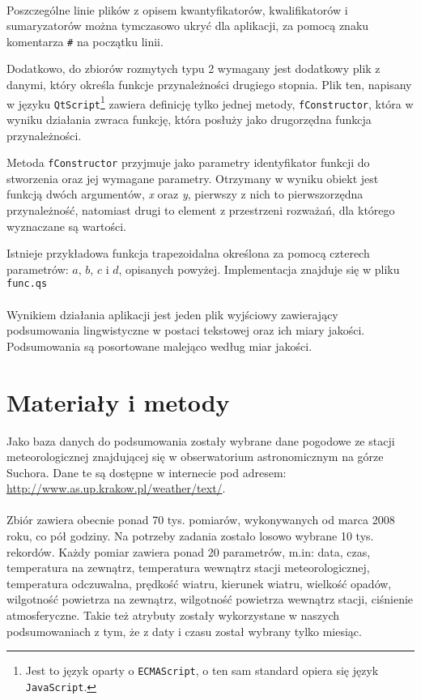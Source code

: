 \documentclass{classrep}
\begin{document}
\paragraph{}
Poszczególne linie plików z opisem kwantyfikatorów, kwalifikatorów i sumaryzatorów można tymczasowo ukryć dla aplikacji, za pomocą znaku komentarza \verb|#| na początku linii.

Dodatkowo, do zbiorów rozmytych typu 2 wymagany jest dodatkowy plik z danymi, który określa funkcje przynależności drugiego stopnia. Plik ten, napisany w języku \verb|QtScript|\footnote{Jest to język oparty o \texttt{ECMAScript}, o ten sam standard opiera się język \texttt{JavaScript}.} zawiera definicję tylko jednej metody, \verb|fConstructor|, która w wyniku działania zwraca funkcję, która posłuży jako drugorzędna funkcja przynależności.

Metoda \verb|fConstructor| przyjmuje jako parametry identyfikator funkcji do stworzenia oraz jej wymagane parametry. Otrzymany w wyniku obiekt jest funkcją dwóch argumentów, \textit{x} oraz \textit{y}, pierwszy z nich to pierwszorzędna przynależność, natomiast drugi to element z przestrzeni rozważań, dla którego wyznaczane są wartości.

Istnieje przykładowa funkcja trapezoidalna określona za pomocą czterech parametrów: $a$, $b$, $c$ i $d$, opisanych powyżej. Implementacja znajduje się w pliku \verb|func.qs|

\paragraph{}
Wynikiem działania aplikacji jest jeden plik wyjściowy zawierający podsumowania lingwistyczne w postaci tekstowej oraz ich miary jakości. Podsumowania są posortowane malejąco według miar jakości.

\section{Materiały i metody}
Jako baza danych do podsumowania zostały wybrane dane pogodowe ze stacji meteorologicznej znajdującej się w obserwatorium astronomicznym na górze Suchora. Dane te są dostępne w internecie pod adresem:
\url{http://www.as.up.krakow.pl/weather/text/}.

\paragraph{}
Zbiór zawiera obecnie ponad 70 tys. pomiarów, wykonywanych od marca 2008 roku, co pół godziny. Na potrzeby zadania zostało losowo wybrane 10 tys. rekordów.
Każdy pomiar zawiera ponad 20 parametrów, m.in: data, czas, temperatura na zewnątrz, temperatura wewnątrz stacji meteorologicznej, temperatura odczuwalna, prędkość wiatru, kierunek wiatru, wielkość opadów, wilgotność powietrza na zewnątrz, wilgotność powietrza wewnątrz stacji, ciśnienie atmosferyczne. Takie też atrybuty zostały wykorzystane w naszych podsumowaniach z tym, że z daty i czasu został wybrany tylko miesiąc.
\end{document}
